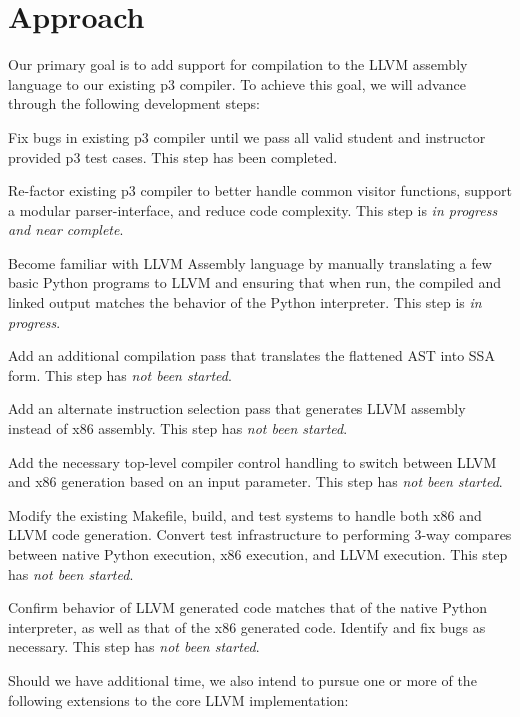 \documentclass[11pt]{article}
\newenvironment{packed_enum}{
\begin{enumerate}
  \setlength{\itemsep}{1pt}
  \setlength{\parskip}{0pt}
  \setlength{\parsep}{0pt}
}{\end{enumerate}}
\begin{document}
\section{Approach}

Our primary goal is to add support for compilation to the
LLVM assembly language to our existing p3 compiler. To achieve this
goal, we will advance through the following development steps:

\begin{packed_enum}
\item Fix bugs in existing p3 compiler until we pass all valid student
  and instructor provided p3 test cases. This step has been completed.
\item Re-factor existing p3 compiler to better handle common visitor
  functions, support a modular parser-interface, and reduce code
  complexity. This step is \emph{in progress and near complete}.
\item Become familiar with LLVM Assembly language by manually translating
  a few basic Python programs to LLVM and ensuring that when run, the compiled
  and linked output matches the behavior of the Python interpreter. This
  step is \emph{in progress}.
\item Add an additional compilation pass that translates the flattened
  AST into SSA form. This step has \emph{not been started}.
\item Add an alternate instruction selection pass that generates LLVM
  assembly instead of x86 assembly. This step has \emph{not been started}.
\item Add the necessary top-level compiler control handling to switch
  between LLVM and x86 generation based on an input parameter. This
  step has \emph{not been started}.
\item Modify the existing Makefile, build, and test systems to handle both x86
  and LLVM code generation. Convert test infrastructure to performing
  3-way compares between native Python execution, x86 execution, and
  LLVM execution. This step has \emph{not been started}.
\item Confirm behavior of LLVM generated code matches that of the
  native Python interpreter, as well as that of the x86 generated
  code. Identify and fix bugs as necessary. This step has \emph{not been started}.
\end{packed_enum}

Should we have additional time, we also intend to pursue one or more
of the following extensions to the core LLVM implementation:
\end{document}
